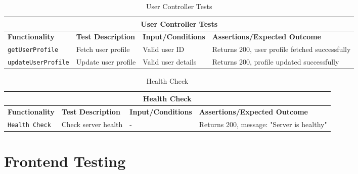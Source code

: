 \begin{table}[ht]
\centering
\begin{tabular}{|p{3.5cm}|p{4cm}|p{3.5cm}|p{5cm}|}
\hline
\multicolumn{4}{|c|}{\textbf{User Controller Tests}} \\
\hline
\textbf{Functionality} & \textbf{Test Description} & \textbf{Input/Conditions} & \textbf{Assertions/Expected Outcome} \\
\hline
\texttt{getUserProfile} &
Fetch user profile &
Valid user ID &
Returns 200, user profile fetched successfully \\
\hline
\texttt{updateUserProfile} &
Update user profile &
Valid user details &
Returns 200, profile updated successfully \\
\hline
\end{tabular}
\caption{User Controller Tests}
\label{tab:user_controller_tests}
\end{table}

\begin{table}[ht]
\centering
\begin{tabular}{|p{3.2cm}|p{4cm}|p{3.5cm}|p{5cm}|}
\hline
\multicolumn{4}{|c|}{\textbf{Health Check}} \\
\hline
\textbf{Functionality} & \textbf{Test Description} & \textbf{Input/Conditions} & \textbf{Assertions/Expected Outcome} \\
\hline
\texttt{Health Check} &
Check server health &
- &
Returns 200, message: "Server is healthy" \\
\hline
\end{tabular}
\caption{Health Check}
\label{tab:health_check}
\end{table}

\clearpage   %

\section{Frontend Testing}
\label{sec:frontend_testing}

